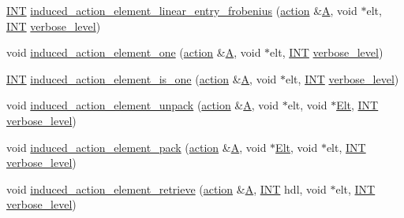 \begin{DoxyCompactItemize}
\item 
\mbox{\hyperlink{galois_8h_a09fddde158a3a20bd2dcadb609de11dc}{I\+NT}} \mbox{\hyperlink{interface_8_c_ac6f3cc9d551022a08abb114689bc69e0}{induced\+\_\+action\+\_\+element\+\_\+linear\+\_\+entry\+\_\+frobenius}} (\mbox{\hyperlink{classaction}{action}} \&\mbox{\hyperlink{simeon_8_c_a97833f04c3a9c008df5521a2fc291bb4}{A}}, void $\ast$elt, \mbox{\hyperlink{galois_8h_a09fddde158a3a20bd2dcadb609de11dc}{I\+NT}} \mbox{\hyperlink{simeon_8_c_a818073fbcc2f439e7c56952f67386122}{verbose\+\_\+level}})
\item 
void \mbox{\hyperlink{interface_8_c_a11ad8abff8304e30e16403a1975a8aab}{induced\+\_\+action\+\_\+element\+\_\+one}} (\mbox{\hyperlink{classaction}{action}} \&\mbox{\hyperlink{simeon_8_c_a97833f04c3a9c008df5521a2fc291bb4}{A}}, void $\ast$elt, \mbox{\hyperlink{galois_8h_a09fddde158a3a20bd2dcadb609de11dc}{I\+NT}} \mbox{\hyperlink{simeon_8_c_a818073fbcc2f439e7c56952f67386122}{verbose\+\_\+level}})
\item 
\mbox{\hyperlink{galois_8h_a09fddde158a3a20bd2dcadb609de11dc}{I\+NT}} \mbox{\hyperlink{interface_8_c_aadb6a2b56e25c82dd455de09bb4bda82}{induced\+\_\+action\+\_\+element\+\_\+is\+\_\+one}} (\mbox{\hyperlink{classaction}{action}} \&\mbox{\hyperlink{simeon_8_c_a97833f04c3a9c008df5521a2fc291bb4}{A}}, void $\ast$elt, \mbox{\hyperlink{galois_8h_a09fddde158a3a20bd2dcadb609de11dc}{I\+NT}} \mbox{\hyperlink{simeon_8_c_a818073fbcc2f439e7c56952f67386122}{verbose\+\_\+level}})
\item 
void \mbox{\hyperlink{interface_8_c_a99c6ddc3d11eeccddf87ca23badd1890}{induced\+\_\+action\+\_\+element\+\_\+unpack}} (\mbox{\hyperlink{classaction}{action}} \&\mbox{\hyperlink{simeon_8_c_a97833f04c3a9c008df5521a2fc291bb4}{A}}, void $\ast$elt, void $\ast$\mbox{\hyperlink{simeon_8_c_aec1406935bdb1fee3561fcb840964100}{Elt}}, \mbox{\hyperlink{galois_8h_a09fddde158a3a20bd2dcadb609de11dc}{I\+NT}} \mbox{\hyperlink{simeon_8_c_a818073fbcc2f439e7c56952f67386122}{verbose\+\_\+level}})
\item 
void \mbox{\hyperlink{interface_8_c_aa80cbe650affcff950137367a431715f}{induced\+\_\+action\+\_\+element\+\_\+pack}} (\mbox{\hyperlink{classaction}{action}} \&\mbox{\hyperlink{simeon_8_c_a97833f04c3a9c008df5521a2fc291bb4}{A}}, void $\ast$\mbox{\hyperlink{simeon_8_c_aec1406935bdb1fee3561fcb840964100}{Elt}}, void $\ast$elt, \mbox{\hyperlink{galois_8h_a09fddde158a3a20bd2dcadb609de11dc}{I\+NT}} \mbox{\hyperlink{simeon_8_c_a818073fbcc2f439e7c56952f67386122}{verbose\+\_\+level}})
\item 
void \mbox{\hyperlink{interface_8_c_a9e51f4ab67af75d0a12a3eb7f211a5b4}{induced\+\_\+action\+\_\+element\+\_\+retrieve}} (\mbox{\hyperlink{classaction}{action}} \&\mbox{\hyperlink{simeon_8_c_a97833f04c3a9c008df5521a2fc291bb4}{A}}, \mbox{\hyperlink{galois_8h_a09fddde158a3a20bd2dcadb609de11dc}{I\+NT}} hdl, void $\ast$elt, \mbox{\hyperlink{galois_8h_a09fddde158a3a20bd2dcadb609de11dc}{I\+NT}} \mbox{\hyperlink{simeon_8_c_a818073fbcc2f439e7c56952f67386122}{verbose\+\_\+level}})

\end{DoxyCompactItemize}
